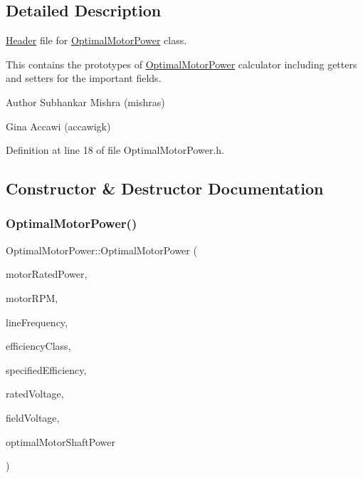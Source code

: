 \subsection{Detailed Description}
\hyperlink{class_header}{Header} file for \hyperlink{class_optimal_motor_power}{Optimal\+Motor\+Power} class. 

This contains the prototypes of \hyperlink{class_optimal_motor_power}{Optimal\+Motor\+Power} calculator including getters and setters for the important fields.

\begin{DoxyAuthor}{Author}
Subhankar Mishra (mishras) 

Gina Accawi (accawigk) 
\end{DoxyAuthor}


Definition at line 18 of file Optimal\+Motor\+Power.\+h.



\subsection{Constructor \& Destructor Documentation}
\mbox{\label{class_optimal_motor_power_a36017bbd359437ce77c1e18dc2377961}} 
\subsubsection{\texorpdfstring{Optimal\+Motor\+Power()}{OptimalMotorPower()}}
{\footnotesize\ttfamily Optimal\+Motor\+Power\+::\+Optimal\+Motor\+Power (\begin{DoxyParamCaption}\item[{double}]{motor\+Rated\+Power,  }\item[{double}]{motor\+R\+PM,  }\item[{Motor\+::\+Line\+Frequency}]{line\+Frequency,  }\item[{Motor\+::\+Efficiency\+Class}]{efficiency\+Class,  }\item[{double}]{specified\+Efficiency,  }\item[{double}]{rated\+Voltage,  }\item[{double}]{field\+Voltage,  }\item[{double}]{optimal\+Motor\+Shaft\+Power }\end{DoxyParamCaption})\hspace{0.3cm}{\ttfamily [inline]}}

